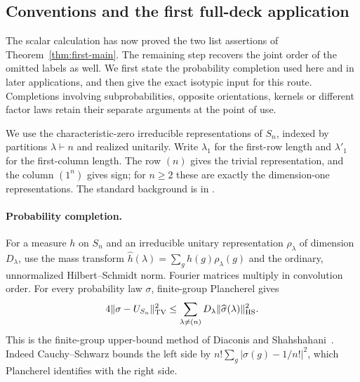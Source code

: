 \subsection{Conventions and the first full-deck application}
\label{sec:probability-completion}

The scalar calculation has now proved the two list assertions of
Theorem~\ref{thm:first-main}. The remaining step recovers the joint
order of the omitted labels as well. We first state the probability
completion used here and in later applications, and then give the exact
isotypic input for this route. Completions involving subprobabilities,
opposite orientations, kernels or different factor laws retain their
separate arguments at the point of use.

We use the characteristic-zero irreducible representations of $S_n$,
indexed by partitions $\lambda\vdash n$ and realized unitarily.
Write $\lambda_1$ for the first-row length and $\lambda'_1$ for the
first-column length. The row $(n)$ gives the trivial representation,
and the column $(1^n)$ gives sign; for $n\ge2$ these are exactly the
dimension-one representations. The standard background is in
\cite{sagan,etingof}.

\paragraph{Probability completion.}
For a measure $h$ on $S_n$ and an irreducible unitary representation
$\rho_\lambda$ of dimension $D_\lambda$, use the mass transform
$\widehat h(\lambda)=\sum_g h(g)\rho_\lambda(g)$ and the ordinary,
unnormalized Hilbert--Schmidt norm. Fourier matrices multiply in
convolution order. For every probability law $\sigma$, finite-group
Plancherel gives
\begin{equation}\label{eq:c-plancherel}
 4\|\sigma-U_{S_n}\|_{\mathrm{TV}}^2
 \le\sum_{\lambda\ne(n)}D_\lambda
              \|\widehat\sigma(\lambda)\|_{\mathrm{HS}}^2.
\end{equation}
This is the finite-group upper-bound method of Diaconis and
Shahshahani~\cite[Section~2 and Lemma~14]{diaconis-shahshahani1981}.
Indeed Cauchy--Schwarz bounds the left side by
$n!\sum_g|\sigma(g)-1/n!|^2$, which Plancherel identifies with the
right side.

